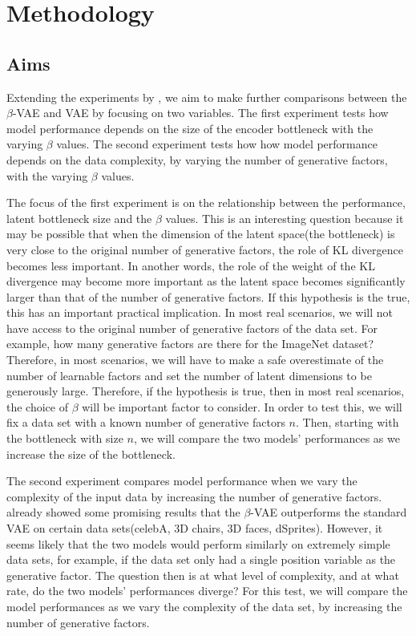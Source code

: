 \chapter{Methodology} \label{ch:methodology}
    \section{Aims} \label{sec:aims}
        Extending the experiments by \cite{higgins2017beta}, we aim to make further comparisons between the $\beta$-VAE and VAE by focusing on two variables. The first experiment tests how model performance depends on the size of the encoder bottleneck with the varying $\beta$ values. The second experiment tests how how model performance depends on the data complexity, by varying the number of generative factors, with the varying $\beta$ values.
        
        The focus of the first experiment is on the relationship between the performance, latent bottleneck size and the $\beta$ values. This is an interesting question because it may be possible that when the dimension of the latent space(the bottleneck) is very close to the original number of generative factors, the role of KL divergence becomes less important. In another words, the role of the weight of the KL divergence may become more important as the latent space becomes significantly larger than that of the number of generative factors. If this hypothesis is the true, this has an important practical implication. In most real scenarios, we will not have access to the original number of generative factors of the data set. For example, how many generative factors are there for the ImageNet\citep{Deng09imagenet:a} dataset? Therefore, in most scenarios, we will have to make a safe overestimate of the number of learnable factors and set the number of latent dimensions to be generously large. Therefore, if the hypothesis is true, then in most real scenarios, the choice of $\beta$ will be important factor to consider. In order to test this, we will fix a data set with a known number of generative factors $n$. Then, starting with the bottleneck with size $n$, we will compare the two models' performances as we increase the size of the bottleneck.
        
        The second experiment compares model performance when we vary the complexity of the input data by increasing the number of generative factors. \cite{higgins2017beta} already showed some promising results that the $\beta$-VAE outperforms the standard VAE on certain data sets(celebA, 3D chairs, 3D faces, dSprites). However, it seems likely that the two models would perform similarly on extremely simple data sets, for example, if the data set only had a single position variable as the generative factor. The question then is at what level of complexity, and at what rate, do the two models' performances diverge? For this test, we will compare the model performances as we vary the complexity of the data set, by increasing the number of generative factors.
        
